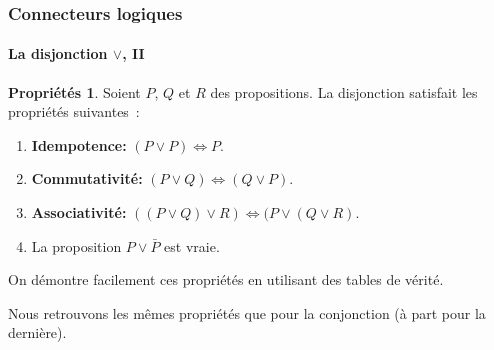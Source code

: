 \documentclass[10pt,notheorems]{beamer}
\theoremstyle{plain}
\theoremstyle{definition} %
\newtheorem{properties}{Propriétés}
\begin{document}
\begin{frame}
  \frametitle{Connecteurs logiques}
  \framesubtitle{La disjonction $\lor$, II}
  \hypertarget{slide_disjonction_2}{}

  \begin{properties}\label{properties:disjonction}
    Soient $P$, $Q$ et $R$ des propositions. La disjonction satisfait
    les propriétés suivantes~:
    \begin{enumerate}
    \item \textbf{Idempotence:} $(P \lor P) \Leftrightarrow P$.
    \item \textbf{Commutativité:}
      $(P \lor Q) \Leftrightarrow (Q \lor P)$.
    \item \textbf{Associativité:}
      $((P \lor Q)\lor R) \Leftrightarrow (P \lor (Q\lor R)$.
    \item La proposition $P \lor \bar P$
      est vraie.
    \end{enumerate}
  \end{properties}

  \bigskip

  On démontre facilement ces propriétés en utilisant des tables de
  vérité.\newline

  Nous retrouvons les mêmes propriétés que pour la conjonction (à part pour la dernière).

\end{frame}
\end{document}
